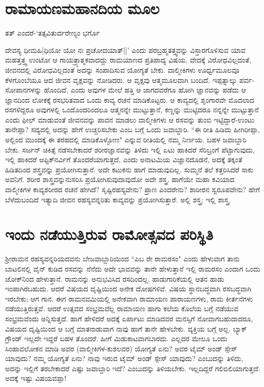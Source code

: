 \section*{ರಾಮಾಯಣಮಹಾನದಿಯ ಮೂಲ} 

ತತ್‍ ಎಂದರೆ-`ತತ್ಸವಿತುರ್ವರೇಣ್ಯಂ ಭರ್ಗೊ

ದೇವಸ್ಯ ಧೀಮಹಿ|ಧಿಯೋ ಯೋ ನಃ ಪ್ರಚೋದಯಾತ್‍||' ಎಂದು ಪರಬ್ರಹ್ಮತತ್ತ್ವವನ್ನು ವಿಸ್ತಾರಗೊಳಿಸುವ ಯಾವ ಮಹತ್ತತ್ತ್ವ ಉಂಟೋ ಆ ಗಾಯತ್ರ್ಯಾತ್ಮಕವಾದದ್ದು ರಾಮಯಾಣದ ಪ್ರತಿಪಾದ್ಯ ವಿಷಯ. ವೇದಕ್ಕೆ ವಿರೋಧವಿಲ್ಲದಂತೆ, ಜೀವನದಲ್ಲಿ ವಿರೋಧವಿಲ್ಲದಂತೆ ಅದನ್ನು ಸಂಪಾದಿಸುವ ಯೋಗ್ಯತೆ ಬೇಕು. ವಾಲ್ಮೀಕಿಗಳು ಊರ್ಧ್ವಮೂಲವೂ ಕೆಳಗೊಂಬೆಯೂ ಆದ ಜೀವನ ವೃಕ್ಷವನ್ನು ನೋಡಿದರು. ಆ ವೃಕ್ಷವು ಆತ್ಮಮೂಲವಾಗಿ ಬಂದಿದೆ. ಇಪ್ಪತ್ನಾಲ್ಕು ಪರ್ವ-ಸೋಪಾನಗಳನ್ನು ಹೊಂದಿದೆ, ಎಂದು ಅವುಗಳ ಮೇಲೆ ಹತ್ತಿ ಆ ಜಾಗದವರೆಗೂ ಹೋಗಿ ಜ್ಞಾನವನ್ನು ಪಡೆದು ಆ ಜ್ಞಾನದಿಂದ ಲೋಕಕ್ಕೆ ರಸಭರಿತವಾದ ಒಂದು ಕಾವ್ಯ ರಚನೆ ಮಾಡಿಕೊಟ್ಟರು. ಆ ಕಾವ್ಯದಲ್ಲಿ ಶೃಂಗಾರವೇ ಮೊದಲಾದ ರಸಗಳಿದ್ದರೂ ಅವುಗಳಲ್ಲಿ ಒಂದೊಂದರಿಂದಲೂ ಆತ್ಮನನ್ನೇ ಮುಟ್ಟುತ್ತಾನೆ, ಕಣ್ಣನ್ನು ಮುಟ್ಟಿದರೂ ನನ್ನನ್ನೇ ಮುಟ್ಟುತ್ತಾನೆ ಎಂದು ಫೀಲ್‍ ಮಾಡುವಂತೆ ಜೀವನವನ್ನು ಪಾವನ ಮಾಡಲು ವಾಲ್ಮೀಕಿಗಳು ಆ ರಸವನ್ನು ತುಂಬಿ ಇಟ್ಟಿದ್ದಾರೆ-ಉಂಟು ತಾನೇಪ್ಪಾ? ಸದ್ಯದಲ್ಲಿ ಅದನ್ನು ಹೇಗೆ ಉಚ್ಚರಿಸಬೇಕು ಎಂಬ ಬಗ್ಗೆ ಒಂದು ಜವಾಬ್ದಾರಿ. ``ಈ ರೀತಿ ಹಿಡಿದು ಹೀಗಿರೀಪ್ಪಾ, ಅಲ್ಲಿಂದ ಮುಂದಕ್ಕೆ ಈ ತರಹದಲ್ಲಿ ಮಾಡಿಕೊಳ್ಳೋಣ" ಎನ್ನುವ ರೀತಿಯಲ್ಲಿ ನಮ್ಮ ನಿರ್ಣಯ. ಬಹಳ ಜವಾಬ್ದಾರಿ ಬೇಕು. ಸರ್ಜನ್‍ ಚಿಕಿತ್ಸೆ ನಡೆಸಬೇಕಾದರೆ ಶರೀರಜ್ಞಾನವನ್ನು ತಿಳಿದು ಇಲ್ಲಿ ಏಟು ಹಾಕಿದರೆ ಸೆರಿಬ್ರಂಗೆ ಪೆಟ್ಟಾಗುವುದು, ಇಲ್ಲಿ ಹಾಕಿದರೆ ಆಪ್ಟಿಕ್‍ನರ್ವಿಗೆ ತೊಂದರೆಯಾಗುತ್ತದೆ, ಎಂದು ಅನಾಟಮಿಯ ವಿಜ್ಞಾನದೊಡನೆ, ಅದಕ್ಕೆ ತಕ್ಕಂತೆ ಹಿಡಿತದಿಂದ ಶಸ್ತ್ರವನ್ನು ಪ್ರಯೋಗಿಸುತ್ತಾನೆ. ಅದೇ ಕಟುಕನು ಹಾಗೆ ಮಾಡುವುದಿಲ್ಲ. ಸುಮ್ಮನೆ ತಲೆ ಕತ್ತರಿಸಿದರೆ ಸಾಕು ಅವನಿಗೆ. ಶರೀರ ಶಾಸ್ತ್ರವನ್ನುನುಸರಿಸಿ ಪ್ರಯೋಗಿಸುವುದಾವುದೋ ಅದೇ ಶಸ್ತ್ರ. ಹಾಗೆಯೇ ಮಹಾ ಕವಿಯಾದ ವಾಲ್ಮೀಕಿಗಳ ಕಾವ್ಯಶರೀರದ ರಚನೆ ಹೇಗಿದೆ? ಸೃಷ್ಟಿರಹಸ್ಯವೇನು? ಪ್ರಾಣ ಎಂದರೇನು? ಶಾರೀರನ ಸ್ವರೂಪವೇನು? ಹೇಗೆ ಬೆಳೆದುಬಂದಿದೆ ಇತ್ಯಾದಿ ಜೀವನ ರಹಸ್ಯವನ್ನರಿತು ಕಾವ್ಯವನ್ನು ಪ್ರಯೋಗಿಸುತ್ತಾರೆ. ಅಲ್ಲಿ ಶಸ್ತ್ರ; ಇಲ್ಲಿ ಶಾಸ್ತ್ರ. 

\section*{ಇಂದು ನಡೆಯುತ್ತಿರುವ ರಾಮೋತ್ಸವದ ಪರಿಸ್ಥಿತಿ} 

ಶ್ರೀರಾಮನ ರಹಸ್ಯವನ್ನರಿಯದವನು ಬೇಜವಾಬ್ದಾರಿಯಿಂದ ``ಪಿಬ ರೇ ರಾಮರಸಂ" ಎಂದು ಹೇಳುವಾಗ ತಾನು ಬಾಟಲಿನಲ್ಲಿ ವೈನ್‍ ಕುಡಿದ ರಸವನ್ನು ನೆನೆದು ಅದೇ ಭಾವವನ್ನು ತಾನೇ ಹೇಳುತ್ತಾನೆ ಇಲ್ಲಿ ರಾಮರಸಂ ಎಂದಾಗ ಒಂದು ಜೋಕ್‍ನಿಂದ ಹೇಳುತ್ತಾನೆ. ರಾಮನನ್ನು ಅನುಭವಿಸಿದ ರಸದಿಂದಲ್ಲ. ಹಾಡುಗಾರಿಕೆಯಲ್ಲಿ ಆತನ ಹಾಡು ಇಂಪಾಗಿರಬಹುದು. ಆದರೆ ವಿಷಯದ ದೃಷ್ಟಿಯಿಂದ ಅನೇಕ ದೋಷಗಳಿವೆ. ವಿಷಯ ಸ್ಥಾನಬದ್ಧವಾಗಿ ರಸಬದ್ಧವಾಗಿ ಇರಬೇಕು; ಆಗ ಗಾನ. ಈಗ ರಾಮನವಮಿಯಲ್ಲಿ ಅನೇಕವಾಗಿ ರಾಮಾಯಣ ಪಾರಾಯಣಗಳು, ರಾಮ ಕೀರ್ತನೆಗಳು ನಡೆಯುತ್ತಿರುತ್ತವೆ. ಆದರೆ ಉತ್ಸವದ ಸಂಭ್ರಮವೆಲ್ಲ ರಾಮಾಯಣ ಹಾಗು ಕಲೆಯ ಕೊಲೆಯ ಬಗ್ಗೆ ನಡೆಯುವ ಸಂಭ್ರಮವೆಂದು ಅನ್ನಿಸುತ್ತದೆ. ಹಾಗೆ ಹೇಳಿದರೆ ಅದಕ್ಕೆ ಏರ್ಪಾಟು ಮಾಡಿದವರ ಮನಸ್ಸಿಗೆ ನೋವಾಗಬಹುದಾದರೂ, ವಿಷಯದ ದೃಷ್ಟಿಯಿಂದ ಆ ಬಗ್ಗೆ ಮಾತನಾಡುವಾಗ ನಾವು ಹಾಗೆ ತಾನೇ ಹೇಳಬೇಕು. ವ್ಯಕ್ತಿಯ ಬಗ್ಗೆ ಅಲ್ಲ. ಬ್ಯಾಕ್‍ ಗ್ರೌಂಡ್‍ ಇಲ್ಲದೇ ಇದ್ದರೆ ಬಹಳ ತೊಂದರೆ. ಹೀಗೆ ಮಿಡುಕಾಟವಾಗಬಾರದು. ಎಲ್ಲದರ ಮೇಲೂ ಒಂದು ಸಿಂಹಾವಲೋಕನ ಮಾಡಿ ಅವರ (ವಾಲ್ಮೀಕಿಗಳ-ಕುಶಲವರ) ಯೋಗ್ಯತೆ ಏನು? ಅವರ ಟೈಮ್‍ ಅಂಡ್‍ ಸ್ಪೇಸ್‍ ಯಾವುದು? ನಮ್ಮ ಯೋಗ್ಯತೆ ಏನು? ನಾವು ಇರುವ ಟೈಮ್‍ ಅಂಡ್‍ ಸ್ಪೇಸ್‍ ಯಾವುದು? ಎಂಬುದನ್ನು ತಿಳಿದು, ಅದನ್ನು ಇಲ್ಲಿಗೆ ತರಬೇಕಾದರೆ ಎಷ್ಟು ಜವಾಬ್ದಾರಿ ಇದೆ? ಎಂಬುದನ್ನು ತಿಳಿಯಬೇಕು. ಇಲ್ಲದಿದ್ದರೆ ಗಲಿಬಿಲಿಯಾಗುತ್ತದೆ. ಅದಕ್ಕೆ ಇಷ್ಟು ವಿಷಯವಪ್ಪಾ! 

